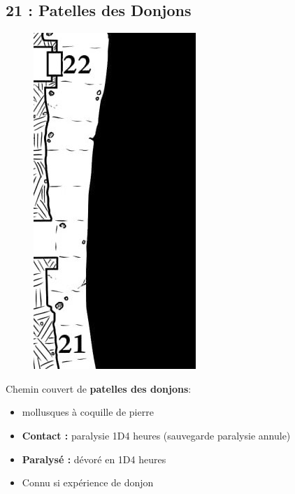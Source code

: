 \subsection{21 : Patelles des Donjons}\label{n2:s21}
\begin{figure}
  \centering
  \includegraphics[width=\linewidth]{pics/map_21-22.jpg}
\end{figure}
Chemin couvert de \textbf{patelles des donjons}:
\begin{itemize}
  \item mollusques à coquille de pierre 
  \item \textbf{Contact :} paralysie 1D4 heures (sauvegarde paralysie annule)
  \item \textbf{Paralysé :} dévoré en 1D4 heures
  \item Connu si expérience de donjon
\end{itemize}




